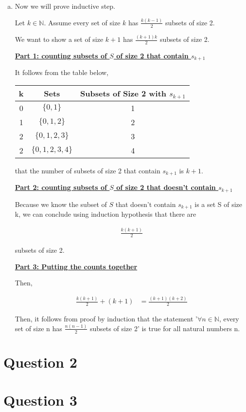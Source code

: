 \documentclass[12pt]{article}
\begin{document}
\begin{enumerate}[a.]
    \item

    Now we will prove inductive step.

    \bigskip

    Let $k \in \mathbb{N}$. Assume every set of size $k$ has $\frac{k(k-1)}{2}$
    subsets of size 2.

    \bigskip

    We want to show a set of size $k+1$ has $\frac{(k+1)k}{2}$ subsets of size 2.

    \bigskip

    \underline{\textbf{Part 1: counting subsets of $S$ of size 2 that contain $s_{k+1}$}}

    \bigskip

    It follows from the table below,

    \begin{tabular}{|c|c|c|}
        \hline
        k & Sets & Subsets of Size 2 with $s_{k+1}$\\
        \hline
        0 & $\{0,1\}$ & 1\\
        \hline
        1 & $\{0,1,2\}$ & 2\\
        \hline
        2 & $\{0,1,2,3\}$ & 3\\
        \hline
        2 & $\{0,1,2,3,4\}$ & 4\\
        \hline
    \end{tabular}

    that the number of subsets of size 2 that contain $s_{k+1}$ is $k+1$.

    \bigskip

    \underline{\textbf{Part 2: counting subsets of $S$ of size 2 that doesn't contain $s_{k+1}$}}

    \bigskip

    Because we know the subset of $S$ that doesn't contain $s_{k+1}$ is a set S
    of size k, we can conclude using induction hypothesis that there are

    \begin{align}
        \frac{k(k+1)}{2}
    \end{align}

    subsets of size 2.

    \bigskip

    \underline{\textbf{Part 3: Putting the counts together}}

    \bigskip

    Then,

    \begin{align}
        \frac{k(k+1)}{2} + (k+1) &= \frac{(k+1)(k+2)}{2}
    \end{align}

    \bigskip

    Then, it follows from proof by induction that the statement '$\forall n \in \mathbb{N}$,
    every set of size n has $\frac{n(n-1)}{2}$ subsets of size 2' is true for all
    natural numbers n.

\end{enumerate}

\section*{Question 2}

\section*{Question 3}
\end{document}
